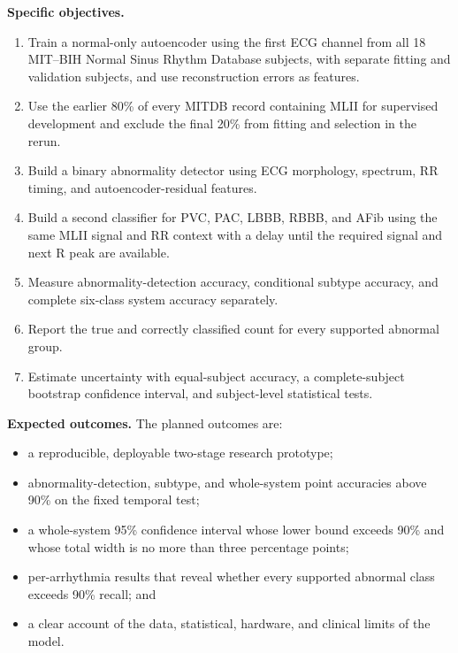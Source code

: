 \textbf{Specific objectives.}
\begin{enumerate}
    \item Train a normal-only autoencoder using the first ECG channel from all
    18 MIT--BIH Normal Sinus Rhythm Database subjects, with separate fitting
    and validation subjects, and use reconstruction errors as features.
    \item Use the earlier 80\% of every MITDB record containing MLII for
    supervised development and exclude the final 20\% from fitting and selection in the rerun.
    \item Build a binary abnormality detector using ECG morphology, spectrum,
    RR timing, and autoencoder-residual features.
    \item Build a second classifier for PVC, PAC, LBBB, RBBB, and AFib using
    the same MLII signal and RR context with a delay until the required signal and next R peak are available.
    \item Measure abnormality-detection accuracy, conditional subtype accuracy,
    and complete six-class system accuracy separately.
    \item Report the true and correctly classified count for every supported abnormal group.
    \item Estimate uncertainty with equal-subject accuracy, a complete-subject
    bootstrap confidence interval, and subject-level statistical tests.
\end{enumerate}

\textbf{Expected outcomes.}
The planned outcomes are:
\begin{itemize}
    \item a reproducible, deployable two-stage research prototype;
    \item abnormality-detection, subtype, and whole-system point accuracies
    above 90\% on the fixed temporal test;
    \item a whole-system 95\% confidence interval whose lower bound exceeds
    90\% and whose total width is no more than three percentage points;
    \item per-arrhythmia results that reveal whether every supported abnormal class
    exceeds 90\% recall; and
    \item a clear account of the data, statistical, hardware, and clinical
    limits of the model.
\end{itemize}

